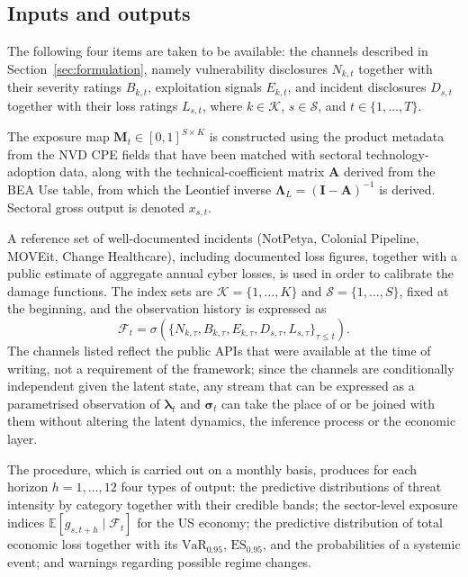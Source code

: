 \documentclass[review]{elsarticle}
\begin{document}
\subsection{Inputs and outputs}

The following four items are taken to be available: the channels described in Section~\ref{sec:formulation}, namely vulnerability disclosures $N_{k,t}$ together with their severity ratings $B_{k,t}$, exploitation signals $E_{k,t}$, and incident disclosures $D_{s,t}$ together with their loss ratings $L_{s,t}$, where $k \in \mathcal{K}$, $s \in \mathcal{S}$, and $t \in \{1, \dots, T\}$.

 The exposure map $\bm{M}_t \in [0,1]^{S \times K}$ is constructed using the product metadata from the NVD CPE fields that have been matched with sectoral technology-adoption data, along with the technical-coefficient matrix $\bm{A}$ derived from the BEA Use table, from which the Leontief inverse $\bm{\Lambda}_L = (\bm{I} - \bm{A})^{-1}$ is derived. Sectoral gross output is denoted $x_{s,t}$.

A reference set of well-documented incidents (NotPetya, Colonial Pipeline, MOVEit, Change Healthcare), including documented loss figures, together with a public estimate of aggregate annual cyber losses, is used in order to calibrate the damage functions. The index sets are $\mathcal{K} = \{1, \dots, K\}$ and $\mathcal{S} = \{1, \dots, S\}$, fixed at the beginning, and the observation history is expressed as
\begin{equation}
    \mathcal{F}_t = \sigma\left(\{N_{k,\tau}, B_{k,\tau}, E_{k,\tau}, D_{s,\tau}, L_{s,\tau}\}_{\tau \leq t}\right).
\end{equation}
The channels listed reflect the public APIs that were available at the time of writing, not a requirement of the framework; since the channels are conditionally independent given the latent state, any stream that can be expressed as a parametrised observation of $\bm{\lambda}_t$ and $\bm{\sigma}_t$ can take the place of or be joined with them without altering the latent dynamics, the inference process or the economic layer.

The procedure, which is carried out on a monthly basis, produces for each horizon $h = 1, \dots, 12$ four types of output: the predictive distributions of threat intensity by category together with their credible bands; the sector-level exposure indices $\mathbb{E}[g_{s,t+h} \mid \mathcal{F}_t]$ for the US economy; the predictive distribution of total economic loss together with its $\mathrm{VaR}_{0.95}$, $\mathrm{ES}_{0.95}$, and the probabilities of a systemic event; and warnings regarding possible regime changes.
\end{document}
